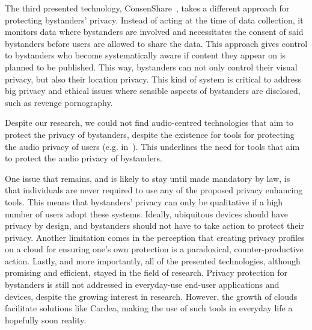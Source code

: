 \documentclass[conference, 11pt]{IEEEtran}
\begin{document}
The third presented technology, ConsenShare~\cite{olteanu2018consensual}, takes a different approach for protecting bystanders' privacy. Instead of acting at the time of data collection, it monitors data where bystanders are involved and necessitates the consent of said bystanders before users are allowed to share the data. This approach gives control to bystanders who become systematically aware if content they appear on is planned to be published. This way, bystanders can not only control their visual privacy, but also their location privacy. This kind of system is critical to address big privacy and ethical issues where sensible aspects of bystanders are disclosed, such as revenge pornography. 

Despite our research, we could not find audio-centred technologies that aim to protect the privacy of bystanders, despite the existence for tools for protecting the audio privacy of users (e.g. in~\cite{larson2011accurate, ahmed2020preech}). This underlines the need for tools that aim to protect the audio privacy of bystanders. 

One issue that remains, and is likely to stay until made mandatory by law, is that individuals are never required to use any of the proposed privacy enhancing tools. This means that bystanders' privacy can only be qualitative if a high number of users adopt these systems. Ideally, ubiquitous devices should have privacy by design, and bystanders should not have to take action to protect their privacy. Another limitation comes in the perception that creating privacy profiles on a cloud for ensuring one's own protection is a paradoxical, counter-productive action. Lastly, and more importantly, all of the presented technologies, although promising and efficient, stayed in the field of research. Privacy protection for bystanders is still not addressed in everyday-use end-user applications and devices, despite the growing interest in research. However, the growth of clouds facilitate solutions like Cardea, making the use of such tools in everyday life a hopefully soon reality.

\end{document}
